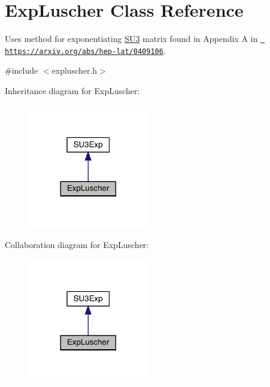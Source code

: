 \hypertarget{class_exp_luscher}{}\section{Exp\+Luscher Class Reference}
\label{class_exp_luscher}


Uses method for exponentiating \mbox{\hyperlink{class_s_u3}{S\+U3}} matrix found in Appendix A in \href{https://arxiv.org/abs/hep-lat/0409106}{\texttt{ https\+://arxiv.\+org/abs/hep-\/lat/0409106}}.  




{\ttfamily \#include $<$expluscher.\+h$>$}



Inheritance diagram for Exp\+Luscher\+:
\nopagebreak
\begin{figure}[H]
\begin{center}
\leavevmode
\includegraphics[width=149pt]{class_exp_luscher__inherit__graph}
\end{center}
\end{figure}


Collaboration diagram for Exp\+Luscher\+:
\nopagebreak
\begin{figure}[H]
\begin{center}
\leavevmode
\includegraphics[width=149pt]{class_exp_luscher__coll__graph}
\end{center}
\end{figure}
